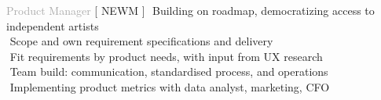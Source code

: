 
    
\begin{cvtable}


{\textcolor{darkgray}{Product Manager}}%
{[ {N\scriptsize EWM} ]}%
{%
     \textperiodcentered $ $ Building on roadmap, democratizing access to independent artists \\
     \textperiodcentered $ $ Scope and own requirement specifications and delivery \\
     \textperiodcentered $ $ Fit requirements by product needs, with input from UX research \\
     \textperiodcentered $ $ Team build: communication, standardised process, and operations \\
     \textperiodcentered $ $ Implementing product metrics with data analyst, marketing, CFO \\
}




\end{cvtable}
